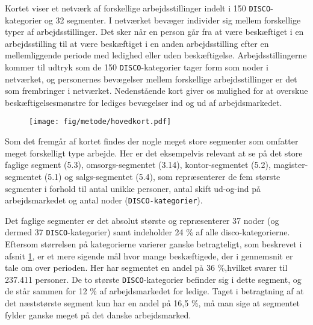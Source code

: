 

Kortet viser et netværk af forskellige arbejdsstillinger indelt i 150 \texttt{DISCO}-kategorier og 32 segmenter. I netværket bevæger individer sig mellem forskellige typer af arbejdsstillinger. Det sker når en person går fra at være beskæftiget i en arbejdsstilling til at være beskæftiget i en anden arbejdsstilling efter en mellemliggende periode med ledighed eller uden beskæftigelse. Arbejdsstillingerne kommer til udtryk som de 150 \texttt{DISCO}-kategorier  tager form som noder i netværket, og personernes bevægelser mellem forskellige arbejdsstillinger er det som frembringer  i netværket. Nedenstående kort giver os mulighed for at overskue beskæftigelsesmønstre for lediges bevægelser ind og ud af arbejdsmarkedet.
% 
\begin{figure}[h]
\begin{centering}
	\texttt{[image: fig/metode/hovedkort.pdf]}
	\label{fig_hist_beskaeftigede_allekategorier}
\end{centering}
\end{figure}

Som det fremgår af kortet findes der nogle meget store segmenter som omfatter meget forskelligt type arbejde. Her er det eksempelvis relevant at se på det store faglige segment (5.3), omsorgs-segmentet (3.14), kontor-segmentet (5.2), magister-segmentet (5.1) og salgs-segmentet (5.4), som repræsenterer de fem største segmenter i forhold til antal unikke personer, antal skift ud-og-ind på arbejdsmarkedet og antal noder (\texttt{DISCO-kategorier}). 

Det faglige segmenter er det absolut største og repræsenterer 37 noder (og dermed 37 \texttt{DISCO}-kategorier) samt indeholder 24 \% af alle disco-kategorierne. Eftersom størrelsen på kategorierne varierer ganske betragteligt, som beskrevet i afsnit \ref{fig_hist_beskaeftigede_allekategorier}, er et mere sigende mål hvor mange beskæftigede, der i gennemsnit er tale om over perioden. Her har segmentet en andel på 36 \%,hvilket svarer til 237.411 personer. De to største \texttt{DISCO}-kategorier befinder sig i dette segment, og de står sammen for 12 \% af arbejdsmarkedet for ledige. Taget i betragtning af at det næststørste segment kun har en andel på 16,5 \%, må man sige at segmentet fylder ganske meget på det danske arbejdsmarked. 

